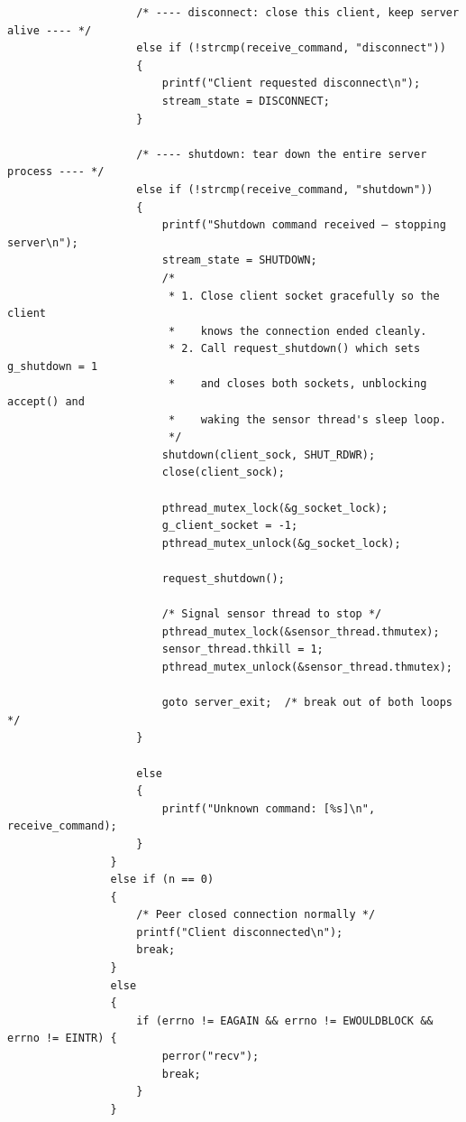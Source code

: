 \begin{verbatim}
                    /* ---- disconnect: close this client, keep server alive ---- */
                    else if (!strcmp(receive_command, "disconnect"))
                    {
                        printf("Client requested disconnect\n");
                        stream_state = DISCONNECT;
                    }
    
                    /* ---- shutdown: tear down the entire server process ---- */
                    else if (!strcmp(receive_command, "shutdown"))
                    {
                        printf("Shutdown command received — stopping server\n");
                        stream_state = SHUTDOWN;
                        /*
                         * 1. Close client socket gracefully so the client
                         *    knows the connection ended cleanly.
                         * 2. Call request_shutdown() which sets g_shutdown = 1
                         *    and closes both sockets, unblocking accept() and
                         *    waking the sensor thread's sleep loop.
                         */
                        shutdown(client_sock, SHUT_RDWR);
                        close(client_sock);
    
                        pthread_mutex_lock(&g_socket_lock);
                        g_client_socket = -1;
                        pthread_mutex_unlock(&g_socket_lock);
    
                        request_shutdown();
    
                        /* Signal sensor thread to stop */
                        pthread_mutex_lock(&sensor_thread.thmutex);
                        sensor_thread.thkill = 1;
                        pthread_mutex_unlock(&sensor_thread.thmutex);
    
                        goto server_exit;  /* break out of both loops */
                    }
    
                    else
                    {
                        printf("Unknown command: [%s]\n", receive_command);
                    }
                }
                else if (n == 0)
                {
                    /* Peer closed connection normally */
                    printf("Client disconnected\n");
                    break;
                }
                else
                {
                    if (errno != EAGAIN && errno != EWOULDBLOCK && errno != EINTR) {
                        perror("recv");
                        break;
                    }
                }
    

\end{verbatim}
